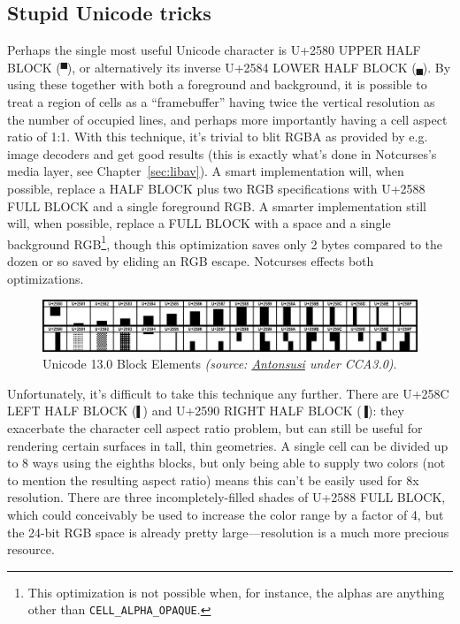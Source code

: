 \subsection{Stupid Unicode tricks}
Perhaps the single most useful Unicode character is U+2580 UPPER HALF BLOCK
(\texttt{▀}), or alternatively its inverse U+2584 LOWER HALF BLOCK
(\texttt{▄}). By using these together with both a foreground and background,
it is possible to treat a region of cells as a ``framebuffer'' having twice the
vertical resolution as the number of occupied lines, and perhaps more importantly
having a cell aspect ratio of 1:1. With this technique, it's trivial to blit
RGBA as provided by e.g. image decoders and get good results (this is exactly
what's done in Notcurses's media layer, see Chapter~\ref{sec:libav}). A smart
implementation will, when possible, replace a HALF BLOCK plus two RGB specifications
with U+2588 FULL BLOCK and a single foreground RGB. A smarter implementation
still will, when possible, replace a FULL BLOCK with a space and a single
background RGB\footnote{This optimization is not possible when, for instance,
the alphas are anything other than \texttt{CELL\_ALPHA\_OPAQUE}.}, though this
optimization saves only 2 bytes compared to the dozen or so saved by eliding
an RGB escape. Notcurses effects both optimizations.


\begin{figure}[!htb]
    \centering
    \includegraphics[width=.75\linewidth]{media/blockelements.png}
    \caption{Unicode 13.0 Block Elements \textit{(source: \href{https://commons.wikimedia.org/wiki/File:UCB_Block_Elements.png}{Antonsusi} under CCA3.0)}.}
    \label{fig:blockelements}
\end{figure}

Unfortunately, it's difficult to take this technique any further. There are
U+258C LEFT HALF BLOCK (\texttt{▌}) and U+2590 RIGHT HALF BLOCK (\texttt{▐}):
they exacerbate the character cell aspect ratio problem, but can still be
useful for rendering certain surfaces in tall, thin geometries. A single cell
can be divided up to 8 ways using the eighths blocks, but only being able to
supply two colors (not to mention the resulting aspect ratio) means this can't
be easily used for 8x resolution. There are three incompletely-filled shades of
U+2588 FULL BLOCK, which could conceivably be used to increase the color range
by a factor of 4, but the 24-bit RGB space is already pretty large---resolution
is a much more precious resource.


